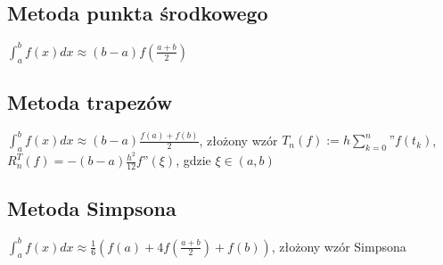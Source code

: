 \documentclass{article}
\begin{document}
\begin{minipage}[t]{.33\textwidth}
\subsection*{Metoda punkta środkowego}
$\int_a^bf(x)dx \approx (b-a)f(\frac{a+b}{2})$
\subsection*{Metoda trapezów}
$\int_a^bf(x)dx \approx (b-a)\frac{f(a) + f(b)}{2}$, złożony wzór $T_n(f) := h\sum_{k=0}^n \text{''}f(t_k)$, $R_n^T(f) = -(b-a)\frac{h^2}{12}f\text{''}(\xi)$, gdzie $\xi \in (a,b)$
\subsection*{Metoda Simpsona}
$\int_a^bf(x)dx \approx \frac{1}{6}(f(a) + 4f(\frac{a+b}{2}) + f(b))$, złożony wzór Simpsona 
\end{minipage} 
\end{document}
